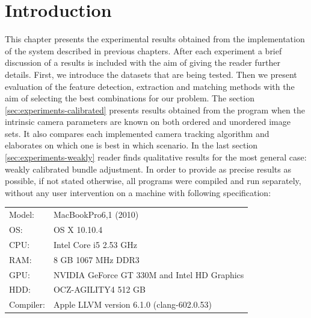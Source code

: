\section{Introduction}
\label{sec:experiments-introduction}
This chapter presents the experimental results obtained from the implementation of the system described in previous chapters. After each experiment a brief discussion of a results is included with the aim of giving the reader further details. First, we introduce the datasets that are being tested. Then we present evaluation of the feature detection, extraction and matching methods with the aim of selecting the best combinations for our problem. The section \ref{sec:experiments-calibrated} presents results obtained from the program when the intrinsic camera parameters are known on both ordered and unordered image sets. It also compares each implemented camera tracking algorithm and elaborates on which one is best in which scenario. In the last section \ref{sec:experiments-weakly} reader finds qualitative results for the most general case: weakly calibrated bundle adjustment.  In order to provide as precise results as possible, if not stated otherwise, all programs were compiled and run separately, without any user intervention on a machine with following specification:
\vspace{.5cm}

\begin{tabular}{ l  l }
	Model: & MacBookPro6,1 (2010) \\
	OS: & OS X 10.10.4 \\
	CPU: & Intel Core i5 2.53 GHz \\
	RAM: & 8 GB 1067 MHz DDR3 \\
	GPU: & NVIDIA GeForce GT 330M and Intel HD Graphics  \\
	HDD: & OCZ-AGILITY4 512 GB \\
	Compiler: & Apple LLVM version 6.1.0 (clang-602.0.53) \\
\end{tabular}

